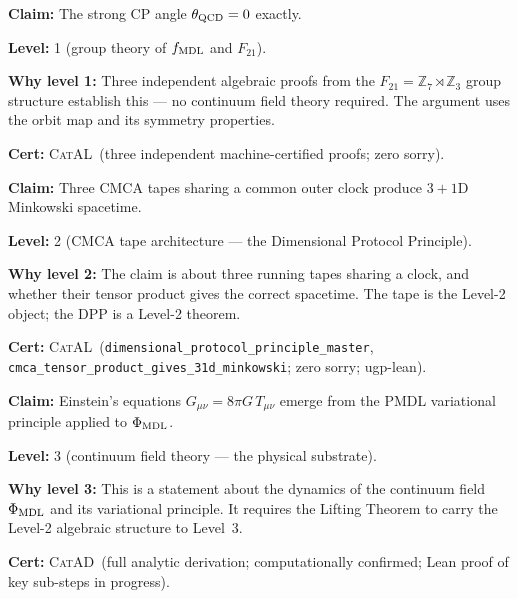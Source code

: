 \documentclass[11pt,a4paper]{article}
\newcommand{\lean}[1]{\texttt{#1}}
\newcommand{\PhiMDL}{\Phi_{\rm MDL}}
\newcommand{\ZS}{\mathbb{Z}_7}
\newcommand{\fMDL}{f_{\rm MDL}}
\newcommand{\CatAL}{\textsc{CatAL}}
\newcommand{\CatAD}{\textsc{CatAD}}
\begin{document}
\begin{tcolorbox}[colback=levone,colframe=blue!50!black,
  title={Level~1 example: strong CP angle $\theta_{\rm QCD} = 0$}]
\textbf{Claim:} The strong CP angle $\theta_{\rm QCD} = 0$ exactly.

\textbf{Level:} 1 (group theory of $\fMDL$ and $F_{21}$).

\textbf{Why level 1:} Three independent algebraic proofs from the
$F_{21} = \ZS\rtimes\mathbb{Z}_3$ group structure establish this ---
no continuum field theory required.
The argument uses the orbit map and its symmetry properties.

\textbf{Cert:} \CatAL\ (three independent machine-certified proofs; zero sorry).
\end{tcolorbox}

\begin{tcolorbox}[colback=levtwo,colframe=green!50!black,
  title=Level~2 example: 3+1D Minkowski structure]
\textbf{Claim:} Three CMCA tapes sharing a common outer clock produce
$3{+}1$D Minkowski spacetime.

\textbf{Level:} 2 (CMCA tape architecture --- the Dimensional Protocol
Principle).

\textbf{Why level 2:} The claim is about three running tapes sharing
a clock, and whether their tensor product gives the correct spacetime.
The tape is the Level-2 object; the DPP is a Level-2 theorem.

\textbf{Cert:} \CatAL\
(\lean{dimensional\_protocol\_principle\_master},
\lean{cmca\_tensor\_product\_gives\_31d\_minkowski};
zero sorry; ugp-lean).
\end{tcolorbox}

\begin{tcolorbox}[colback=levthree,colframe=purple!50!black,
  title=Level~3 example: Einstein's equations]
\textbf{Claim:} Einstein's equations
$G_{\mu\nu} = 8\pi G\,T_{\mu\nu}$ emerge from the PMDL variational
principle applied to $\PhiMDL$.

\textbf{Level:} 3 (continuum field theory --- the physical substrate).

\textbf{Why level 3:} This is a statement about the dynamics of the
continuum field $\PhiMDL$ and its variational principle.
It requires the Lifting Theorem to carry the Level-2 algebraic structure
to Level~3.

\textbf{Cert:} \CatAD\ (full analytic derivation; computationally confirmed;
Lean proof of key sub-steps in progress).
\end{tcolorbox}
\end{document}
